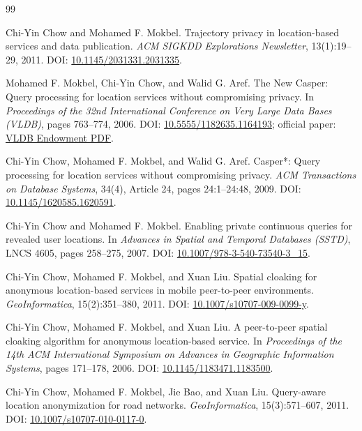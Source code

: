 \documentclass[11pt,a4paper,oneside]{report}
\begin{document}
\clearpage
\begin{thebibliography}{99}
\small

Chi-Yin Chow and Mohamed F. Mokbel.
\newblock Trajectory privacy in location-based services and data publication.
\newblock \emph{ACM SIGKDD Explorations Newsletter}, 13(1):19--29, 2011.
\newblock DOI: \href{https://doi.org/10.1145/2031331.2031335}{10.1145/2031331.2031335}.

Mohamed F. Mokbel, Chi-Yin Chow, and Walid G. Aref.
\newblock The New Casper: Query processing for location services without compromising privacy.
\newblock In \emph{Proceedings of the 32nd International Conference on Very Large Data Bases (VLDB)}, pages 763--774, 2006.
\newblock DOI: \href{https://doi.org/10.5555/1182635.1164193}{10.5555/1182635.1164193};
official paper: \href{https://www.vldb.org/conf/2006/p763-mokbel.pdf}{VLDB Endowment PDF}.

Chi-Yin Chow, Mohamed F. Mokbel, and Walid G. Aref.
\newblock Casper*: Query processing for location services without compromising privacy.
\newblock \emph{ACM Transactions on Database Systems}, 34(4), Article 24, pages 24:1--24:48, 2009.
\newblock DOI: \href{https://doi.org/10.1145/1620585.1620591}{10.1145/1620585.1620591}.

Chi-Yin Chow and Mohamed F. Mokbel.
\newblock Enabling private continuous queries for revealed user locations.
\newblock In \emph{Advances in Spatial and Temporal Databases (SSTD)}, LNCS 4605, pages 258--275, 2007.
\newblock DOI: \href{https://doi.org/10.1007/978-3-540-73540-3_15}{10.1007/978-3-540-73540-3\_15}.

Chi-Yin Chow, Mohamed F. Mokbel, and Xuan Liu.
\newblock Spatial cloaking for anonymous location-based services in mobile peer-to-peer environments.
\newblock \emph{GeoInformatica}, 15(2):351--380, 2011.
\newblock DOI: \href{https://doi.org/10.1007/s10707-009-0099-y}{10.1007/s10707-009-0099-y}.

Chi-Yin Chow, Mohamed F. Mokbel, and Xuan Liu.
\newblock A peer-to-peer spatial cloaking algorithm for anonymous location-based service.
\newblock In \emph{Proceedings of the 14th ACM International Symposium on Advances in Geographic Information Systems}, pages 171--178, 2006.
\newblock DOI: \href{https://doi.org/10.1145/1183471.1183500}{10.1145/1183471.1183500}.

Chi-Yin Chow, Mohamed F. Mokbel, Jie Bao, and Xuan Liu.
\newblock Query-aware location anonymization for road networks.
\newblock \emph{GeoInformatica}, 15(3):571--607, 2011.
\newblock DOI: \href{https://doi.org/10.1007/s10707-010-0117-0}{10.1007/s10707-010-0117-0}.


\end{thebibliography}
\end{document}
